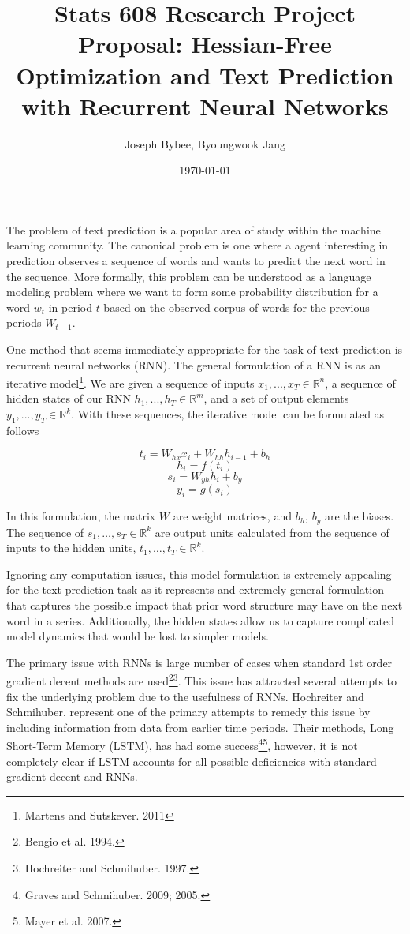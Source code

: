 \documentclass{article}
\begin{document}
\title{Stats 608 Research Project Proposal: Hessian-Free Optimization and Text Prediction with Recurrent Neural Networks}
\author{Joseph Bybee, Byoungwook Jang}
\date{\today}

\maketitle

The problem of text prediction is a popular area of study within the machine learning community.  The canonical problem is one where a agent interesting in prediction observes a sequence of words and wants to predict the next word in the sequence.  More formally, this problem can be understood as a language modeling problem where we want to form some probability distribution for a word $w_t$ in period $t$ based on the observed corpus of words for the previous periods $W_{t-1}$.

One method that seems immediately appropriate for the task of text prediction is recurrent neural networks (RNN).  The general formulation of a RNN is as an iterative model\footnote{Martens and Sutskever. 2011}. We are given a sequence of inputs $x_1,...,x_T \in \mathbb{R}^n$, a sequence of hidden states of our RNN $h_1,...,h_T \in \mathbb{R}^m$, and a set of output elements $y_1,...,y_T \in \mathbb{R}^k$.  With these sequences, the iterative model can be formulated as follows

$$t_i = W_{hx} x_i + W_{hh} h_{i-1} + b_h$$
$$h_i = f(t_i)$$
$$s_i = W_{yh} h_i + b_y$$
$$y_i = g(s_i)$$

In this formulation, the matrix $W$ are weight matrices, and $b_h$, $b_y$ are the biases. The sequence of $s_1, \dots, s_T \in \mathbb{R}^k$ are output units calculated from the sequence of inputs to the hidden units, $t_1, \dots, t_T \in \mathbb{R}^k$.

Ignoring any computation issues, this model formulation is extremely appealing for the text prediction task as it represents and extremely general formulation that captures the possible impact that prior word structure may have on the next word in a series.  Additionally, the hidden states allow us to capture complicated model dynamics that would be lost to simpler models.

The primary issue with RNNs is large number of cases when standard 1st order gradient decent methods are used\footnote{Bengio et al. 1994.}\footnote{Hochreiter and Schmihuber. 1997.}.  This issue has attracted several attempts to fix the underlying problem due to the usefulness of RNNs.  Hochreiter and Schmihuber, represent one of the primary attempts to remedy this issue by including information from data from earlier time periods.  Their methods, Long Short-Term Memory (LSTM), has had some success\footnote{Graves and Schmihuber. 2009; 2005.}\footnote{Mayer et al. 2007.}, however, it is not completely clear if LSTM accounts for all possible deficiencies with standard gradient decent and RNNs.
\end{document}
